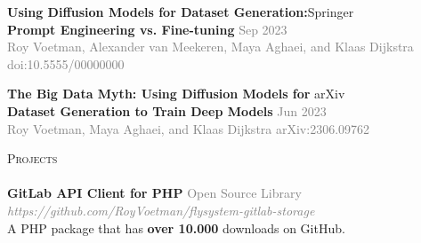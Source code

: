 \documentclass[a4paper]{article}
\newcommand{\lineunder} {
    \vspace*{-8pt} \\
    \hspace*{-18pt} \hrulefill \\
}
\newcommand{\header} [1] {
    {\hspace*{-18pt}\vspace*{6pt} \textsc{#1}}
    \vspace*{-6pt} \lineunder
}
\begin{document}
\textbf{Using Diffusion Models for Dataset Generation:}\hfill Springer\\
\small{\textbf{Prompt Engineering vs. Fine-tuning} \hfill \textcolor{gray}{Sep 2023}}\\
\footnotesize{\textcolor{gray}{Roy Voetman, Alexander van Meekeren, Maya Aghaei, and Klaas Dijkstra} \hfill
\textcolor{gray}{doi:10.5555/00000000}}\\
\normalsize
\vspace{2mm}

\textbf{The Big Data Myth: Using Diffusion Models for }\hfill arXiv\\
\small{\textbf{Dataset Generation to Train Deep Models} \hfill \textcolor{gray}{Jun 2023}}\\
\footnotesize{\textcolor{gray}{Roy Voetman, Maya Aghaei, and Klaas Dijkstra \hfill
 	arXiv:2306.09762}}\\
\normalsize
\vspace{2mm}

\vspace{5mm}

\header{Projects}

{\textbf{GitLab API Client for PHP}} \hfill \textcolor{gray}{Open Source Library}\\
\textcolor{gray}{\emph{https://github.com/RoyVoetman/flysystem-gitlab-storage}}\\
A PHP package that has \textbf{over 10.000} downloads on GitHub.

\ 
\end{document}
